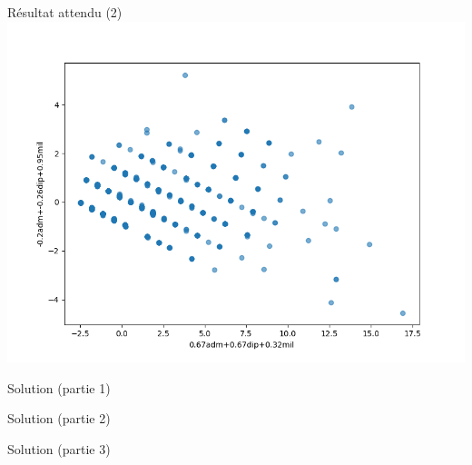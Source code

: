 \documentclass[11pt]{beamer}
\newcommand{\Python}[1]{
	{\small	}
}
\begin{document}
\begin{frame}{Résultat attendu (2)}
\includegraphics[scale=0.45]{ex403}
\end{frame}


\begin{frame}{Solution (partie 1)}
\Python{ex401}
\end{frame}

\begin{frame}{Solution (partie 2)}
\Python{ex402}
\end{frame}

\begin{frame}{Solution (partie 3)}
\Python{ex403}
\end{frame}
\end{document}
